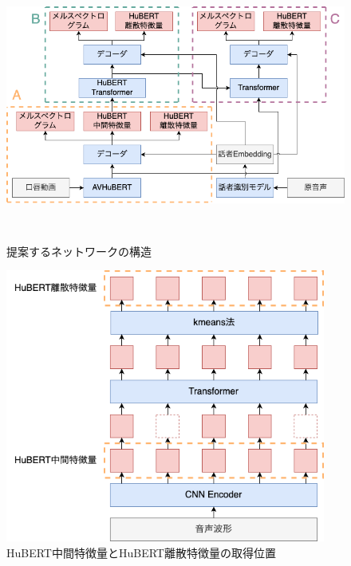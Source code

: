 \documentclass[12pt]{jarticle}
\numberwithin{equation}{section}    %
\numberwithin{figure}{section}      %
\numberwithin{table}{section}      %
\begin{document}
\begin{figure}[bt]
    \centering
    \includegraphics[height=90mm]{./figure/sec4/model/network.drawio.png}
    \caption{提案するネットワークの構造}
    \label{sec4:fig:network}
\end{figure}

\begin{figure}[bt]
    \centering
    \includegraphics[height=90mm]{./figure/sec4/model/hubert.png}
    \caption{HuBERT中間特徴量とHuBERT離散特徴量の取得位置}
    \label{sec4:fig:hubert}
\end{figure}
\end{document}
